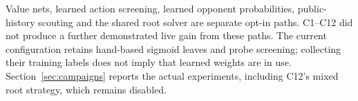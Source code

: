 Value nets, learned action screening, learned opponent probabilities,
public-history scouting and the shared root solver are separate opt-in paths.
C1--C12 did not produce a further demonstrated live gain from these paths.
The current configuration retains hand-based sigmoid leaves and probe
screening; collecting their training labels does not imply that learned
weights are in use. Section~\ref{sec:campaigns} reports the actual
experiments, including C12's mixed root strategy, which remains disabled.

